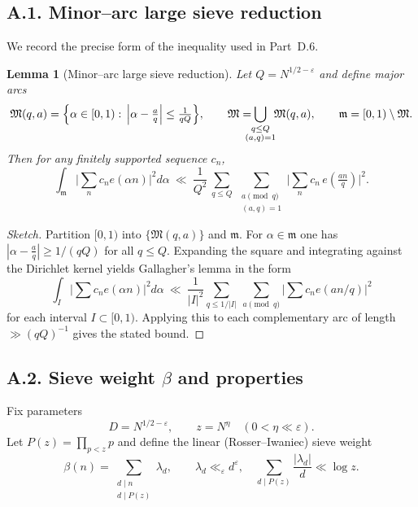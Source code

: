 \documentclass[11pt]{article}
\newtheorem{lemma}{Lemma}[section]
\theoremstyle{definition}
\theoremstyle{remark}
\begin{document}
\subsection*{A.1. Minor--arc large sieve reduction}

We record the precise form of the inequality used in Part~D.6.

\begin{lemma}[Minor--arc large sieve reduction]\label{lem:largesieve-minor}
	Let $Q=N^{1/2-\varepsilon}$ and define major arcs
	\[
		\mathfrak M(q,a)=\Bigl\{\alpha\in[0,1):\,\Big|\alpha-\tfrac{a}{q}\Big|\le \tfrac{1}{qQ}\Bigr\},
		\qquad \mathfrak M=\!\!\!\!\!\bigcup_{\substack{q\le Q\\ (a,q)=1}}\!\!\mathfrak M(q,a),
		\qquad \mathfrak m=[0,1)\setminus\mathfrak M.
	\]
	Then for any finitely supported sequence $c_n$,
	\[
		\int_{\mathfrak m}\Big|\sum_{n}c_n e(\alpha n)\Big|^2 d\alpha
		\ \ll\ \frac{1}{Q^2}\,
		\sum_{q\le Q}\ \sum_{\substack{a\!\!\!\pmod q\\ (a,q)=1}}
		\Big|\sum_{n} c_n\,e\!\left(\tfrac{an}{q}\right)\Big|^2.
	\]
\end{lemma}

\begin{proof}[Sketch]
	Partition $[0,1)$ into $\{\mathfrak M(q,a)\}$ and $\mathfrak m$. For $\alpha\in\mathfrak m$ one has
	$|\alpha-\tfrac aq|\ge 1/(qQ)$ for all $q\le Q$. Expanding the square and integrating against the Dirichlet kernel yields Gallagher’s lemma in the form
	\[
		\int_{I} \Big|\sum c_n e(\alpha n)\Big|^2 d\alpha
		\ \ll\ \frac{1}{|I|^2}\sum_{q\le 1/|I|}\ \sum_{a\pmod q}\Big|\sum c_n e(an/q)\Big|^2
	\]
	for each interval $I\subset[0,1)$. Applying this to each complementary arc of length $\gg (qQ)^{-1}$ gives the stated bound.
\end{proof}

\subsection*{A.2. Sieve weight $\beta$ and properties}

Fix parameters
\[
	D=N^{1/2-\varepsilon},\qquad z=N^{\eta}\quad(0<\eta\ll \varepsilon).
\]
Let $P(z)=\prod_{p<z}p$ and define the linear (Rosser--Iwaniec) sieve weight
\[
	\beta(n)=\sum_{\substack{d\mid n\\ d\mid P(z)}} \lambda_d,\qquad
	\lambda_d\ll_\varepsilon d^{\varepsilon},\quad
	\sum_{d\mid P(z)}\frac{|\lambda_d|}{d}\ll \log z.
\]
\end{document}
